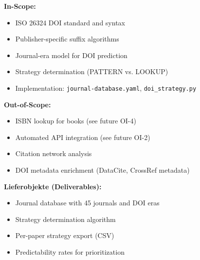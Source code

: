 \begin{tcolorbox}[colback=yellow!5, colframe=yellow!50, title=Appendix Scope: What This Appendix Covers]
\small
\textbf{In-Scope:}
\begin{itemize}[noitemsep]
    \item ISO 26324 DOI standard and syntax
    \item Publisher-specific suffix algorithms
    \item Journal-era model for DOI prediction
    \item Strategy determination (PATTERN vs. LOOKUP)
    \item Implementation: \texttt{journal-database.yaml}, \texttt{doi\_strategy.py}
\end{itemize}

\textbf{Out-of-Scope:}
\begin{itemize}[noitemsep]
    \item ISBN lookup for books (see future OI-4)
    \item Automated API integration (see future OI-2)
    \item Citation network analysis
    \item DOI metadata enrichment (DataCite, CrossRef metadata)
\end{itemize}

\textbf{Lieferobjekte (Deliverables):}
\begin{itemize}[noitemsep]
    \item Journal database with 45 journals and DOI eras
    \item Strategy determination algorithm
    \item Per-paper strategy export (CSV)
    \item Predictability rates for prioritization
\end{itemize}
\end{tcolorbox}

\begin{abstract}
This appendix documents the Digital Object Identifier (DOI) system as implemented in the Evidence-Based Framework (EBF) bibliography. We present the international standard ISO 26324, analyze publisher-specific suffix algorithms, and develop a journal-era model that enables predictive DOI generation for approximately 24\% of papers. For the remaining 76\%, we document the appropriate lookup strategies (CrossRef, JSTOR, publisher APIs). The journal database covers 45 journals with 2,324 papers, achieving 31\% DOI coverage with a clear path to 100\% through systematic application of the strategy determination algorithm.
\end{abstract}

